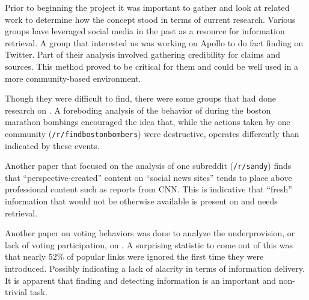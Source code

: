 Prior to beginning the project it was important to gather and look at related
work to determine how the concept stood in terms of current research. Various
groups have leveraged social media in the past as a resource for information
retrieval. A group that interested us was working on Apollo to do fact finding
on Twitter. Part of their analysis involved gathering credibility for claims and
sources.\cite{Le:2011:DDL:2070942.2071018} This method proved to be critical for
them and could be well used in a more community-based environment.


Though they were difficult to find, there were some groups that had done
research on \reddit{}. A foreboding analysis of the behavior of \reddit{} during
the boston marathon bombings encouraged the idea that, while the actions taken
by one community (\texttt{/r/findbostonbombers}) were destructive, \reddit{}
operates differently than indicated by these events.
\cite{Potts:2013:IRC:2507065.2507079}

Another paper that focused on the analysis of one subreddit (\texttt{/r/sandy})
finds that ``perspective-created'' content on ``social news sites'' tends to
place above professional content such as reports from CNN.
\cite{Leavitt:2014:UHS:2556288.2557140} This is indicative that ``fresh''
information that would not be otherwise available is present on \reddit{} and
needs retrieval.

Another paper on voting behaviors was done to analyze the underprovision, or
lack of voting participation, on \reddit{}. A surprising statistic to come out
of this was that nearly 52\% of popular links were ignored the first time they
were introduced.\cite{Gilbert:2013:WUR:2441776.2441866} Possibly indicating a
lack of alacrity in terms of information delivery. It is apparent that finding
and detecting information is an important and non-trivial task.
